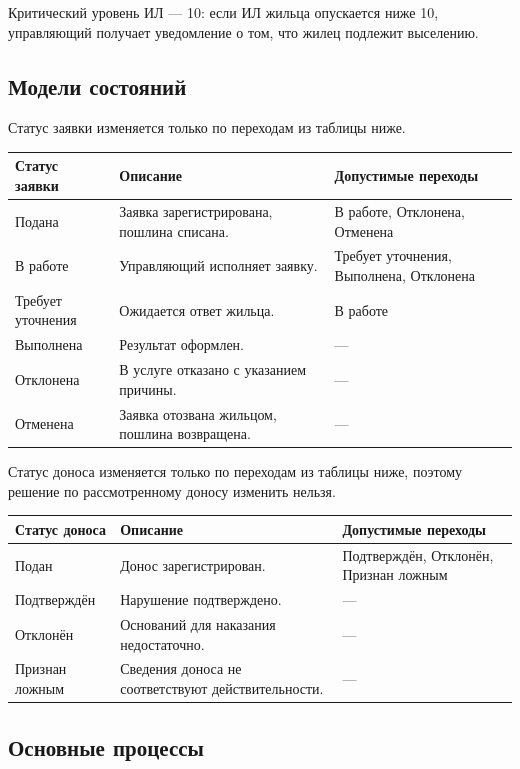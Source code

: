 \documentclass[12pt,a4paper]{article}
\begin{document}
Критический уровень ИЛ --- 10: если ИЛ жильца опускается ниже 10,
управляющий получает уведомление о том, что жилец подлежит выселению.

\subsection{Модели состояний}

Статус заявки изменяется только по переходам из таблицы ниже.

\begin{longtable}{L{36mm} L{64mm} L{52mm}}
\toprule
\textbf{Статус заявки} & \textbf{Описание} & \textbf{Допустимые переходы} \\
\midrule
\endhead
\bottomrule
\endfoot
Подана & Заявка зарегистрирована, пошлина списана. & В работе, Отклонена, Отменена \\
В работе & Управляющий исполняет заявку. & Требует уточнения, Выполнена, Отклонена \\
Требует уточнения & Ожидается ответ жильца. & В работе \\
Выполнена & Результат оформлен. & --- \\
Отклонена & В услуге отказано с указанием причины. & --- \\
Отменена & Заявка отозвана жильцом, пошлина возвращена. & --- \\
\end{longtable}

Статус доноса изменяется только по переходам из таблицы ниже, поэтому
решение по рассмотренному доносу изменить нельзя.

\begin{longtable}{L{36mm} L{64mm} L{52mm}}
\toprule
\textbf{Статус доноса} & \textbf{Описание} & \textbf{Допустимые переходы} \\
\midrule
\endhead
\bottomrule
\endfoot
Подан & Донос зарегистрирован. & Подтверждён, Отклонён, Признан ложным \\
Подтверждён & Нарушение подтверждено. & --- \\
Отклонён & Оснований для наказания недостаточно. & --- \\
Признан ложным & Сведения доноса не соответствуют действительности. & --- \\
\end{longtable}

\subsection{Основные процессы}
\end{document}
